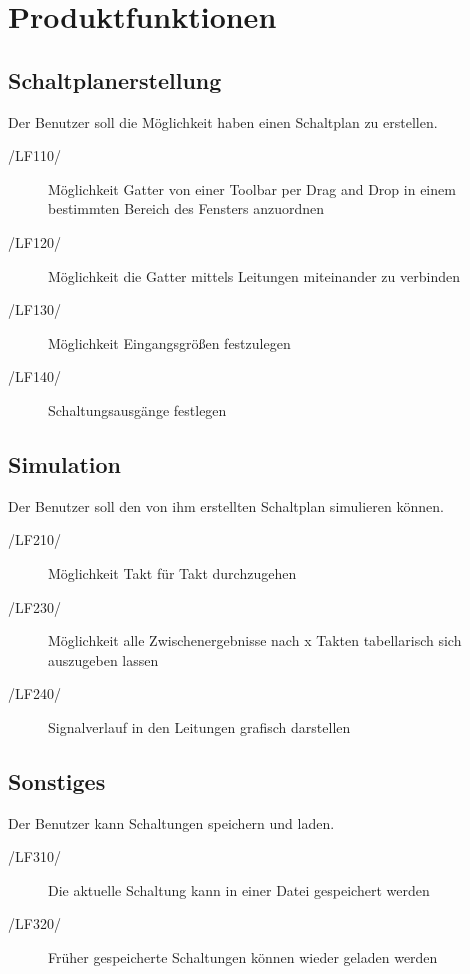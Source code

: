
\section{Produktfunktionen}


\subsection{Schaltplanerstellung}

Der Benutzer soll die Möglichkeit haben einen Schaltplan zu erstellen.
\begin{description}
	\item[/LF110/] Möglichkeit Gatter von einer Toolbar per Drag and Drop in einem bestimmten Bereich des Fensters anzuordnen
	\item[/LF120/] Möglichkeit die Gatter mittels Leitungen miteinander zu verbinden
	\item[/LF130/] Möglichkeit Eingangsgrößen festzulegen
	\item[/LF140/] Schaltungsausgänge festlegen
\end{description}

\subsection{Simulation}

Der Benutzer soll den von ihm erstellten Schaltplan simulieren können. 
\begin{description}
	\item[/LF210/] Möglichkeit Takt für Takt durchzugehen
	\item[/LF230/] Möglichkeit alle Zwischenergebnisse nach x Takten tabellarisch sich auszugeben lassen
	\item[/LF240/] Signalverlauf in den Leitungen grafisch darstellen
\end{description}

\subsection{Sonstiges}
Der Benutzer kann Schaltungen speichern und laden.
\begin{description}
	\item[/LF310/] Die aktuelle Schaltung kann in einer Datei gespeichert werden
	\item[/LF320/] Früher gespeicherte Schaltungen können wieder geladen werden
\end{description}